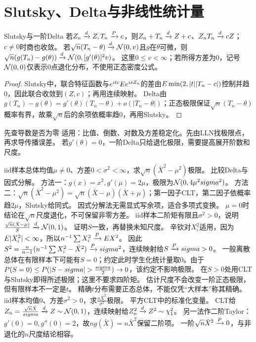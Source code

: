 \section{Slutsky、Delta与非线性统计量}\label{sec:55}
\begin{theorem}{Slutsky与一阶Delta}
若$Z_n\xrightarrow{d} Z,T_n\xrightarrow{P} c$，则$Z_n+T_n\xrightarrow{d} Z+c$、$Z_nT_n\xrightarrow{d} cZ$；$c\ne0$时商也收敛。
若$\sqrt n(T_n-\theta)\xrightarrow{d}\mathcal N(0,v)$且$g$在$\theta$可微，则
$\sqrt n(g(T_n)-g(\theta))\xrightarrow{d}\mathcal N(0,[g'(\theta)]^2v)$。
这里$0\le v<\infty$；若所得方差为0，记号$\mathcal N(0,0)$仅表示0点退化分布，不使用正态密度公式。
\end{theorem}
\begin{proof}
Slutsky中，联合特征函数与$e^{itc}E e^{isZ_n}$的差由$E\min(2,|t||T_n-c|)$控制并趋0，因此联合收敛到$(Z,c)$；再用连续映射。
Delta由$g(T_n)-g(\theta)=g'(\theta)(T_n-\theta)+o(|T_n-\theta|)$；正态极限保证$\sqrt n(T_n-\theta)$概率有界，故乘$\sqrt n$后的余项依概率趋0，再用Slutsky。
\end{proof}
\begin{method}{先查导数是否为零}
适用：比值、倒数、对数及方差稳定化。先由LLN找极限点，再求导传播误差。
若$g'(\theta)=0$，一阶Delta只给退化极限，需要提高展开阶数和尺度。
\end{method}
{iid样本总体均值$\mu\ne0$、方差$0<\sigma^2<\infty$，求$\sqrt n(\bar X^2-\mu^2)$极限。}
{比较Delta与因式分解。}
{方法一：$g(x)=x^2,g'(\mu)=2\mu$，极限为$\mathcal N(0,4\mu^2sigma^2)$。
方法二：$\sqrt n(\bar X^2-\mu^2)=\sqrt n(\bar X-\mu)(\bar X+\mu)$；第一因子CLT，第二因子依概率趋$2\mu$，Slutsky给同式。}
{因式分解法无需显式写余项，适合多项式变换。}
{$\mu=0$时结论在$\sqrt n$尺度退化，不可保留非零方差。}
{iid样本二阶矩有限且$\sigma^2>0$，说明$\frac{\sqrt n(\bar X-\mu)}{S}\xrightarrow{d}\mathcal N(0,1)$。}
{证明$S$一致，再替换未知尺度。}
{辛钦对$X_i^2$适用，因为$E|X_i^2|<\infty$，所以$n^{-1}\sum X_i^2\xrightarrow{P}E X^2$。
因此$S^2=\frac n{n-1}(n^{-1}\sum X_i^2-\bar X^2)\xrightarrow{P}sigma^2$，连续映射给$S\xrightarrow{P}sigma>0$。
一般离散总体在有限样本下可能有$S=0$；约定此时学生化统计量取0。由于$\Pp(S=0)\le\Pp(|S-\sigma|>\frac{\sigma}{2})\to0$，该约定不影响极限。
在$S>0$处用CLT与Slutsky即得所述极限；这里不要求四阶矩。}
{估计尺度不会改变一阶正态极限，但有限样本不一定是$t$。}
{精确$t$分布需要正态总体，不能仅凭“大样本”称其精确。}
{iid样本均值0、方差$\sigma^2>0$，求$\frac{n\bar X^2}{\sigma^2}$极限。}
{平方CLT中的标准化变量。}
{CLT给$Z_n=\frac{\sqrt n\bar X}{sigma}\xrightarrow{d} Z\sim\mathcal N(0,1)$，连续映射给$Z_n^2\xrightarrow{d} Z^2\sim\chi_1^2$。
另一法作二阶Taylor：$g'(0)=0,g''(0)=2$，故$n g(\bar X)=n\bar X^2$保留二阶项。
一阶$\sqrt n\bar X^2\xrightarrow{P}0$，与非退化的$n$尺度结论相容。}
